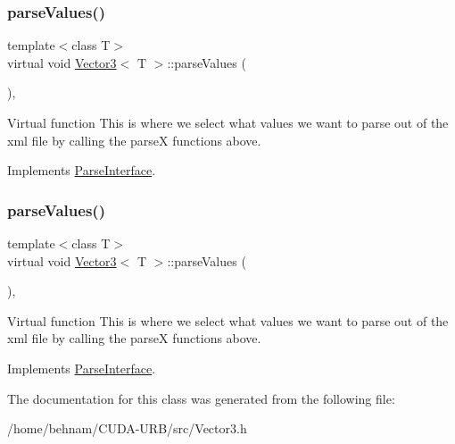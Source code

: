 \subsubsection{\texorpdfstring{parse\+Values()}{parseValues()}\hspace{0.1cm}{\footnotesize\ttfamily [1/2]}}
{\footnotesize\ttfamily template$<$class T$>$ \\
virtual void \hyperlink{classVector3}{Vector3}$<$ T $>$\+::parse\+Values (\begin{DoxyParamCaption}{ }\end{DoxyParamCaption})\hspace{0.3cm}{\ttfamily [inline]}, {\ttfamily [virtual]}}

Virtual function This is where we select what values we want to parse out of the xml file by calling the parseX functions above. 

Implements \hyperlink{classParseInterface_afca32108192ba0997c9e5a78189b0cbc}{Parse\+Interface}.

\mbox{\label{classVector3_a15a1271a3ba4497ca95cc4dd66481f9e}} 
\subsubsection{\texorpdfstring{parse\+Values()}{parseValues()}\hspace{0.1cm}{\footnotesize\ttfamily [2/2]}}
{\footnotesize\ttfamily template$<$class T$>$ \\
virtual void \hyperlink{classVector3}{Vector3}$<$ T $>$\+::parse\+Values (\begin{DoxyParamCaption}{ }\end{DoxyParamCaption})\hspace{0.3cm}{\ttfamily [inline]}, {\ttfamily [virtual]}}

Virtual function This is where we select what values we want to parse out of the xml file by calling the parseX functions above. 

Implements \hyperlink{classParseInterface_afca32108192ba0997c9e5a78189b0cbc}{Parse\+Interface}.



The documentation for this class was generated from the following file\+:\begin{DoxyCompactItemize}
\item 
/home/behnam/\+C\+U\+D\+A-\/\+U\+R\+B/src/Vector3.\+h\end{DoxyCompactItemize}
